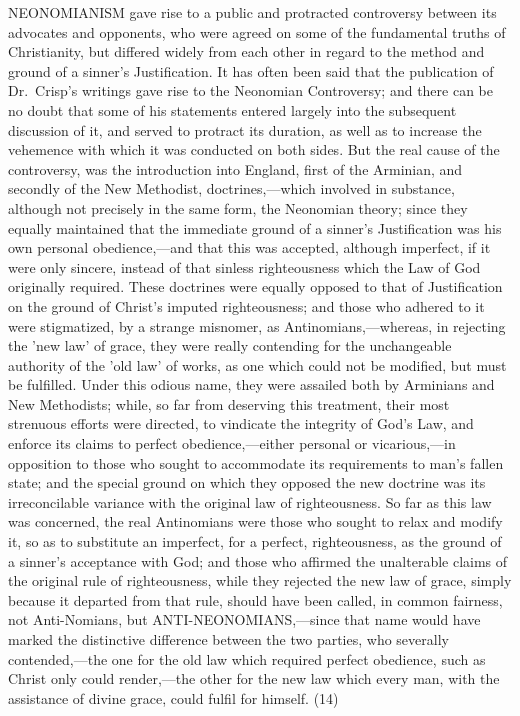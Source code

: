 \documentclass[
]{book}
\begin{document}
NEONOMIANISM gave rise to a public and protracted controversy between its advocates and opponents, who were agreed on some of the fundamental truths of Christianity, but differed widely from each other in regard to the method and ground of a sinner's Justification. It has often been said that the publication of Dr.~Crisp's writings gave rise to the Neonomian Controversy; and there can be no doubt that some of his statements entered largely into the subsequent discussion of it, and served to protract its duration, as well as to increase the vehemence with which it was conducted on both sides. But the real cause of the controversy, was the introduction into England, first of the Arminian, and secondly of the New Methodist, doctrines,---which involved in substance, although not precisely in the same form, the Neonomian theory; since they equally maintained that the immediate ground of a sinner's Justification was his own personal obedience,---and that this was accepted, although imperfect, if it were only sincere, instead of that sinless righteousness which the Law of God originally required. These doctrines were equally opposed to that of Justification on the ground of Christ's imputed righteousness; and those who adhered to it were stigmatized, by a strange misnomer, as Antinomians,---whereas, in rejecting the 'new law' of grace, they were really contending for the unchangeable authority of the 'old law' of works, as one which could not be modified, but must be fulfilled. Under this odious name, they were assailed both by Arminians and New Methodists; while, so far from deserving this treatment, their most strenuous efforts were directed, to vindicate the integrity of God's Law, and enforce its claims to perfect obedience,---either personal or vicarious,---in opposition to those who sought to accommodate its requirements to man's fallen state; and the special ground on which they opposed the new doctrine was its irreconcilable variance with the original law of righteousness. So far as this law was concerned, the real Antinomians were those who sought to relax and modify it, so as to substitute an imperfect, for a perfect, righteousness, as the ground of a sinner's acceptance with God; and those who affirmed the unalterable claims of the original rule of righteousness, while they rejected the new law of grace, simply because it departed from that rule, should have been called, in common fairness, not Anti-Nomians, but ANTI-NEONOMIANS,---since that name would have marked the distinctive difference between the two parties, who severally contended,---the one for the old law which required perfect obedience, such as Christ only could render,---the other for the new law which every man, with the assistance of divine grace, could fulfil for himself. (14)
\end{document}
